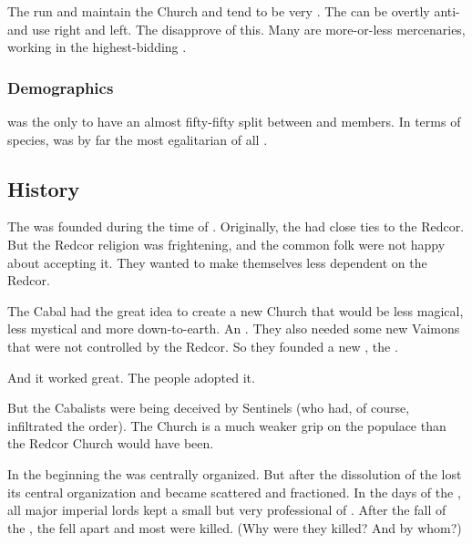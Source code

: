 The \clerics{} run and maintain the \Telcra{} Church and tend to be very \Iquinian. 
The \templars{} can be overtly anti-\Iquinian{} and use \itzach{} right and left. 
The \clerics{} disapprove of this. 
Many \templars{} are more-or-less mercenaries, working in the highest-bidding \ishrah. 





\subsubsection{Demographics}
\ClanTelcra{} was the only \vclan to have an almost fifty-fifty split between \human{} and \scatha{} members. 
In terms of species, \Telcra{} was by far the most egalitarian of all \VaimonClans. 









\subsection{History}
The \vclan was founded during the time of . 
Originally, the \bacconate{} had close ties to the Redcor. 
But the Redcor religion was frightening, and the common folk were not happy about accepting it. 
They wanted to make themselves less dependent on the Redcor. 

The Cabal had the great idea to create a new \Iquinian{} Church that would be less magical, less mystical and more down-to-earth. 
An . 
They also needed some new Vaimons that were not controlled by the Redcor. 
So they founded a new \VaimonClan, the \Telcra. 

And it worked great. 
The people adopted it.

But the Cabalists were being deceived by Sentinels (who had, of course, infiltrated the order). 
The \Telcra{} Church is a much weaker grip on the populace than the Redcor Church would have been. 

In the beginning the \vclan was centrally organized. 
But after the dissolution of \Tepharae{} the \vclan lost its central organization and became scattered and fractioned. 
In the days of the \bacconate, all major imperial lords kept a small but very professional \ishrah{} of \Telcras. 
After the fall of the \bacconate, the \vclan fell apart and most were killed. 
(Why were they killed? And by whom?) 

